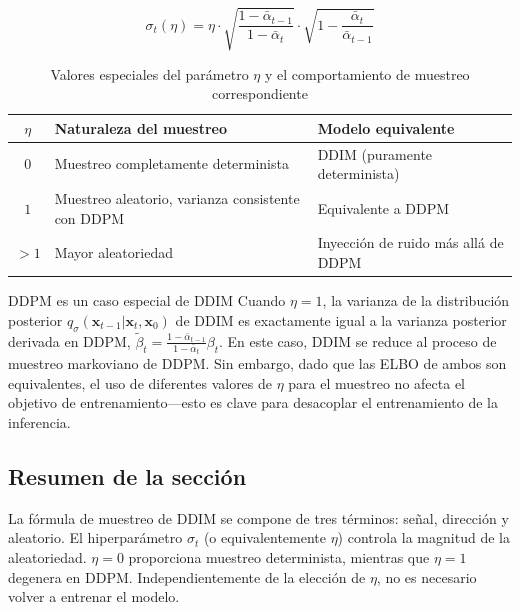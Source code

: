 $$
\sigma_t(\eta) = \eta \cdot \sqrt{\frac{1-\bar{\alpha}_{t-1}}{1-\bar{\alpha}_t}} \cdot \sqrt{1 - \frac{\bar{\alpha}_t}{\bar{\alpha}_{t-1}}}
$$

\begin{table}[H]
\centering
\caption{Valores especiales del parámetro $\eta$ y el comportamiento de muestreo correspondiente}
\begin{tabular}{cll}
\toprule
$\eta$ & \textbf{Naturaleza del muestreo} & \textbf{Modelo equivalente} \\
\midrule
$0$ & Muestreo completamente determinista & DDIM (puramente determinista) \\
$1$ & Muestreo aleatorio, varianza consistente con DDPM & Equivalente a DDPM \\
$>1$ & Mayor aleatoriedad & Inyección de ruido más allá de DDPM \\
\bottomrule
\end{tabular}
\end{table}

\begin{warningbox}{DDPM es un caso especial de DDIM}
Cuando $\eta = 1$, la varianza de la distribución posterior $q_\sigma(\mathbf{x}_{t-1}|\mathbf{x}_t, \mathbf{x}_0)$ de DDIM es exactamente igual a la varianza posterior derivada en DDPM, $\tilde{\beta}_t = \frac{1-\bar{\alpha}_{t-1}}{1-\bar{\alpha}_t}\beta_t$. En este caso, DDIM se reduce al proceso de muestreo markoviano de DDPM. Sin embargo, dado que las ELBO de ambos son equivalentes, el uso de diferentes valores de $\eta$ para el muestreo no afecta el objetivo de entrenamiento—esto es clave para desacoplar el entrenamiento de la inferencia.
\end{warningbox}

\subsection{Resumen de la sección}

La fórmula de muestreo de DDIM se compone de tres términos: señal, dirección y aleatorio. El hiperparámetro $\sigma_t$ (o equivalentemente $\eta$) controla la magnitud de la aleatoriedad. $\eta=0$ proporciona muestreo determinista, mientras que $\eta=1$ degenera en DDPM. Independientemente de la elección de $\eta$, no es necesario volver a entrenar el modelo.
